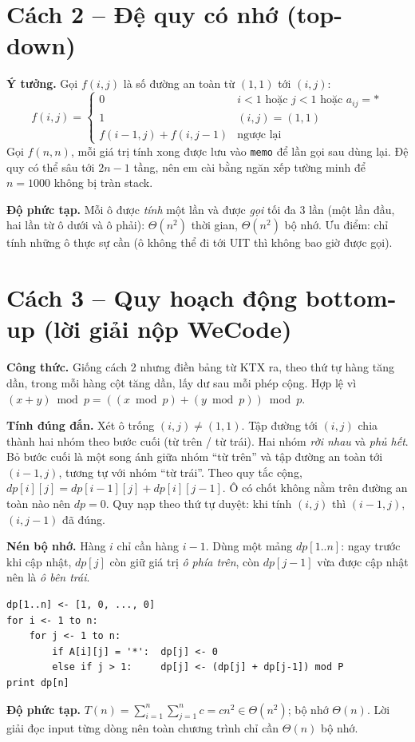 \documentclass[12pt,a4paper]{report}
\begin{document}
\section{Cách 2 -- Đệ quy có nhớ (top-down)}
\textbf{Ý tưởng.} Gọi $f(i,j)$ là số đường an toàn từ $(1,1)$ tới $(i,j)$:
\[ f(i,j)=\begin{cases}0 & i<1 \text{ hoặc } j<1 \text{ hoặc } a_{ij}=\texttt{*}\\ 1 & (i,j)=(1,1)\\ f(i-1,j)+f(i,j-1) & \text{ngược lại}\end{cases} \]
Gọi $f(n,n)$, mỗi giá trị tính xong được lưu vào \texttt{memo} để lần gọi sau dùng lại. Đệ quy có thể sâu tới $2n-1$ tầng, nên em cài bằng ngăn xếp tường minh để $n=1000$ không bị tràn stack.

\textbf{Độ phức tạp.} Mỗi ô được \emph{tính} một lần và được \emph{gọi} tối đa 3 lần (một lần đầu, hai lần từ ô dưới và ô phải): $\Theta(n^2)$ thời gian, $\Theta(n^2)$ bộ nhớ. Ưu điểm: chỉ tính những ô thực sự cần (ô không thể đi tới UIT thì không bao giờ được gọi).

\section{Cách 3 -- Quy hoạch động bottom-up (lời giải nộp WeCode)}
\textbf{Công thức.} Giống cách 2 nhưng điền bảng từ KTX ra, theo thứ tự hàng tăng dần, trong mỗi hàng cột tăng dần, lấy dư sau mỗi phép cộng. Hợp lệ vì $(x+y)\bmod p=((x\bmod p)+(y\bmod p))\bmod p$.

\textbf{Tính đúng đắn.} Xét ô trống $(i,j)\neq(1,1)$. Tập đường tới $(i,j)$ chia thành hai nhóm theo bước cuối (từ trên / từ trái). Hai nhóm \emph{rời nhau} và \emph{phủ hết}. Bỏ bước cuối là một song ánh giữa nhóm ``từ trên'' và tập đường an toàn tới $(i-1,j)$, tương tự với nhóm ``từ trái''. Theo quy tắc cộng, $dp[i][j]=dp[i-1][j]+dp[i][j-1]$. Ô có chốt không nằm trên đường an toàn nào nên $dp=0$. Quy nạp theo thứ tự duyệt: khi tính $(i,j)$ thì $(i-1,j)$, $(i,j-1)$ đã đúng.

\textbf{Nén bộ nhớ.} Hàng $i$ chỉ cần hàng $i-1$. Dùng một mảng $dp[1..n]$: ngay trước khi cập nhật, $dp[j]$ còn giữ giá trị \emph{ô phía trên}, còn $dp[j-1]$ vừa được cập nhật nên là \emph{ô bên trái}.
\begin{lstlisting}
dp[1..n] <- [1, 0, ..., 0]
for i <- 1 to n:
    for j <- 1 to n:
        if A[i][j] = '*':  dp[j] <- 0
        else if j > 1:     dp[j] <- (dp[j] + dp[j-1]) mod P
print dp[n]
\end{lstlisting}
\textbf{Độ phức tạp.} $T(n)=\sum_{i=1}^n\sum_{j=1}^n c = cn^2\in\Theta(n^2)$; bộ nhớ $\Theta(n)$. Lời giải đọc input từng dòng nên toàn chương trình chỉ cần $\Theta(n)$ bộ nhớ.
\end{document}
